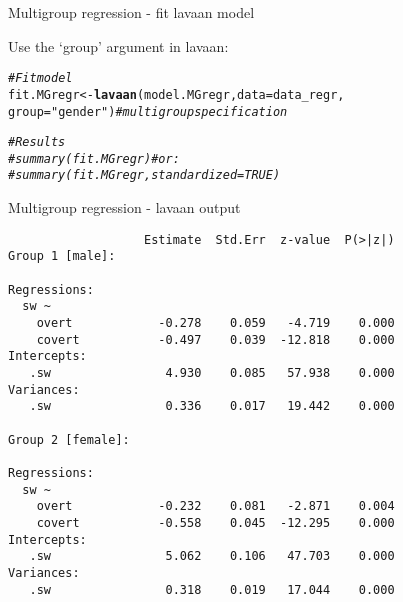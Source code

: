 \documentclass[10pt]{beamer}\usepackage[]{graphicx}\usepackage[]{xcolor}
\makeatletter
\newcommand{\hlsng}[1]{\textcolor[rgb]{0.192,0.494,0.8}{#1}}%
\newcommand{\hlcom}[1]{\textcolor[rgb]{0.678,0.584,0.686}{\textit{#1}}}%
\newcommand{\hldef}[1]{\textcolor[rgb]{0.345,0.345,0.345}{#1}}%
\newcommand{\hlkwb}[1]{\textcolor[rgb]{0.69,0.353,0.396}{#1}}%
\newcommand{\hlkwc}[1]{\textcolor[rgb]{0.333,0.667,0.333}{#1}}%
\newcommand{\hlkwd}[1]{\textcolor[rgb]{0.737,0.353,0.396}{\textbf{#1}}}%
\newenvironment{kframe}{%
 \def\at@end@of@kframe{}%
 \ifinner\ifhmode%
  \def\at@end@of@kframe{\end{minipage}}%
  \begin{minipage}{\columnwidth}%
 \fi\fi%
 \def\FrameCommand##1{\hskip\@totalleftmargin \hskip-\fboxsep
 \colorbox{shadecolor}{##1}\hskip-\fboxsep
     \hskip-\linewidth \hskip-\@totalleftmargin \hskip\columnwidth}%
 \MakeFramed {\advance\hsize-\width
   \@totalleftmargin\z@ \linewidth\hsize
   \@setminipage}}%
 {\par\unskip\endMakeFramed%
 \at@end@of@kframe}
\newenvironment{knitrout}{}{} %
\makeatother
\begin{document}
%
\begin{frame}[fragile]{Multigroup regression - fit lavaan model}

Use the `group' argument in lavaan:

\vspace{5mm}

\begin{knitrout}
\color{fgcolor}\begin{kframe}
\begin{alltt}
\hlcom{# Fit model}
\hldef{fit.MGregr} \hlkwb{<-} \hlkwd{lavaan}\hldef{(model.MGregr,} \hlkwc{data} \hldef{= data_regr,}
              \hlkwc{group} \hldef{=} \hlsng{"gender"}\hldef{)} \hlcom{# multigroup specification}
\end{alltt}


{\ttfamily\noindent\color{warningcolor}{\#\# Warning: lavaan->lav\_data\_full(): \ \\\#\# \ \ \ group variable 'gender' contains missing values}}\begin{alltt}
\hlcom{# Results}
\hlcom{#summary(fit.MGregr) # or:}
\hlcom{#summary(fit.MGregr, standardized = TRUE)}
\end{alltt}
\end{kframe}
\end{knitrout}
          
\end{frame}
%
\begin{frame}[fragile]{Multigroup regression - lavaan output}

\footnotesize{
\begin{verbatim}
                   Estimate  Std.Err  z-value  P(>|z|)
Group 1 [male]:

Regressions:
  sw ~                                                
    overt            -0.278    0.059   -4.719    0.000
    covert           -0.497    0.039  -12.818    0.000
Intercepts:
   .sw                4.930    0.085   57.938    0.000
Variances:
   .sw                0.336    0.017   19.442    0.000

Group 2 [female]:

Regressions:
  sw ~                                                
    overt            -0.232    0.081   -2.871    0.004
    covert           -0.558    0.045  -12.295    0.000
Intercepts:
   .sw                5.062    0.106   47.703    0.000
Variances:
   .sw                0.318    0.019   17.044    0.000
\end{verbatim}    
}
\end{frame}
\end{document}
